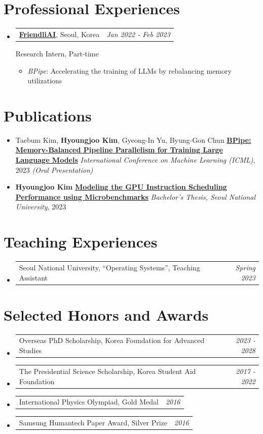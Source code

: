 \documentclass[a4paper]{article}
\makeatletter
\newcommand{\resumeSubheading}[4]{
  \vspace{-1pt}\item
    \begin{tabular*}{0.97\textwidth}{l@{\extracolsep{\fill}}r}
      \textbf{#1}, #2 & \textit{#3} \\
    \end{tabular*}
    #4
}
\newcommand{\resumeSubheadingSimple}[2]{
  \vspace{-1pt}\item
	\begin{tabular*}{0.97\textwidth}{l@{\extracolsep{\fill}}r}
	  #1 & \textit{#2} \\
	\end{tabular*}
  \vspace{-5pt}
}
\newcommand{\resumeSubheadingItem}[1]{
  \vspace{0pt}\item #1
  \vspace{0pt}
}
\newcommand{\resumeSubHeadingListStart}{\begin{itemize}[leftmargin=*]}
\newcommand{\resumeSubHeadingListEnd}{\end{itemize}}
\makeatother
\begin{document}
\section{Professional Experiences}
\resumeSubHeadingListStart
	\resumeSubheading
		{\href{https://friendli.ai}{FriendliAI}}{Seoul, Korea}
		{Jan 2022 - Feb 2023}
		{
			Research Intern, Part-time
			\vspace{-5pt}
			\begin{itemize}
				\item {\textit{BPipe}: Accelerating the training of LLMs by rebalancing memory utilizations}
			\end{itemize}
		}
\resumeSubHeadingListEnd
\vspace{0pt}

\section{Publications}
\resumeSubHeadingListStart
	\resumeSubheadingItem{
		Taebum Kim, \textbf{Hyoungjoo Kim}, Gyeong-In Yu, Byung-Gon Chun \newline
		\href{https://openreview.net/forum?id=HVKmLi1iR4}{\textbf{BPipe: Memory-Balanced Pipeline Parallelism for Training Large Language Models}} \newline
		\textit{International Conference on Machine Learning (ICML)}, 2023 \textit{(Oral Presentation)}
	}
	\resumeSubheadingItem{
		\textbf{Hyoungjoo Kim} \newline
		\href{https://snu-primo.hosted.exlibrisgroup.com/permalink/f/1qb4pk8/82SNU_INST21903413170002591}{\textbf{Modeling the GPU Instruction Scheduling Performance using Microbenchmarks}} \newline
		\textit{Bachelor's Thesis, Seoul National University}, 2023
	}

\resumeSubHeadingListEnd
\vspace{0pt}

\section{Teaching Experiences}
\resumeSubHeadingListStart
	\resumeSubheadingSimple{
		Seoul National University, ``Operating Systems'', Teaching Assistant
	}{Spring 2023}
\resumeSubHeadingListEnd
\vspace{0pt}

\section{Selected Honors and Awards}
\resumeSubHeadingListStart
\resumeSubheadingSimple{
	Overseas PhD Scholarship, Korea Foundation for Advanced Studies
}{2023 - 2028}
\resumeSubheadingSimple{
	The Presidential Science Scholarship, Korea Student Aid Foundation
}{2017 - 2022}
\resumeSubheadingSimple{
	International Physics Olympiad, Gold Medal
}{2016}
\resumeSubheadingSimple{
	Samsung Humantech Paper Award, Silver Prize
}{2016}
\resumeSubHeadingListEnd
\vspace{0pt}
\end{document}
